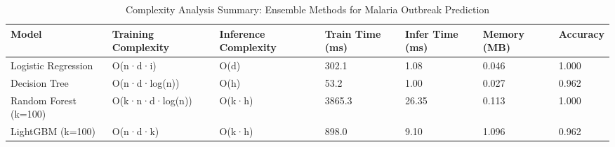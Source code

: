 \documentclass{article}
\begin{document}
\begin{table}[ht]
\centering
\caption{Complexity Analysis Summary: Ensemble Methods for Malaria Outbreak Prediction}
\label{tab:complexity_summary}
\begin{tabular}{lllllll}
\toprule
Model & Training Complexity & Inference Complexity & Train Time (ms) & Infer Time (ms) & Memory (MB) & Accuracy \\
\midrule
Logistic Regression & O(n·d·i) & O(d) & 302.1 & 1.08 & 0.046 & 1.000 \\
Decision Tree & O(n·d·log(n)) & O(h) & 53.2 & 1.00 & 0.027 & 0.962 \\
Random Forest (k=100) & O(k·n·d·log(n)) & O(k·h) & 3865.3 & 26.35 & 0.113 & 1.000 \\
LightGBM (k=100) & O(n·d·k) & O(k·h) & 898.0 & 9.10 & 1.096 & 0.962 \\
\bottomrule
\end{tabular}
\end{table}
\end{document}
